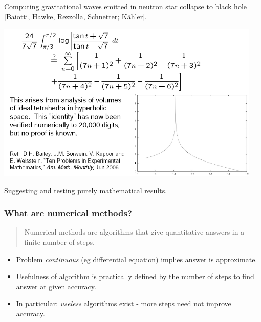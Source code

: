 \documentclass{beamer}
\begin{document}
\begin{frame}
\begin{overlayarea}{\textwidth}{0.8\textheight}
{\begin{center}
        Computing gravitational waves emitted in neutron star collapse
        to black hole
        \href{http://dx.doi.org/10.1088/0264-9381/24/12/S13}{{\tiny
            [Baiotti, Hawke, Rezzolla, Schnetter; K{\"a}hler]}}.
      \end{center}
    }
    {
      \begin{center}
        \includegraphics[width=0.95\textwidth]{figures/QuadPic1}

        Suggesting and testing purely mathematical results.
      \end{center}
    }
  \end{overlayarea}

\end{frame}

\begin{frame}
  \frametitle{What are numerical methods?}

  \begin{quotation}
    Numerical methods are algorithms that give quantitative answers in
    a finite number of steps.
  \end{quotation}
  \pause
  \begin{itemize}
  \item Problem \emph{continuous} (eg
    differential equation) implies answer is  approximate.\pause
  \item Usefulness of algorithm is practically defined by the
    number of steps to find answer at given accuracy.\pause
  \item In particular: \emph{useless}
    algorithms exist - more steps need not improve accuracy.
  \end{itemize}

\end{frame}
\end{document}
